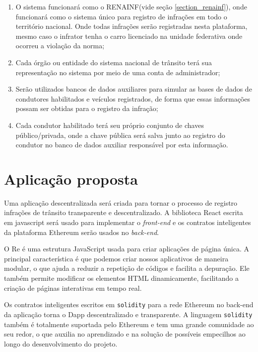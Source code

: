     \begin{enumerate}
        \item O sistema funcionará como o RENAINF(vide seção \ref{section_renainf}), onde funcionará como o sistema único para registro de infrações em todo o território nacional. Onde todas infrações serão registradas nesta plataforma, mesmo caso o infrator tenha o carro licenciado na unidade federativa onde ocorreu a violação da norma;
        \item Cada órgão ou entidade do sistema nacional de trânsito terá sua representação no sistema por meio de uma conta de administrador;
        \item Serão utilizados bancos de dados auxiliares para simular as bases de dados de condutores habilitados e veículos registrados, de forma que essas informações possam ser obtidas para o registro da infração;
        \item Cada condutor habilitado terá seu próprio conjunto de chaves público/privada, onde a chave pública será salva junto ao registro do condutor no banco de dados auxiliar responsável por esta informação.
    \end{enumerate}


\section{Aplicação proposta}

Uma aplicação descentralizada será criada para tornar o processo de registro infrações de trânsito transparente e descentralizado. A biblioteca React escrita em javascript será usado para implementar o \textit{front-end} e os contratos inteligentes da plataforma Ethereum serão usados no \textit{back-end}. 

O Re é uma estrutura JavaScript usada para criar aplicações de página única. A principal característica é que podemos criar nossos aplicativos de maneira modular, o que ajuda a reduzir a repetição de códigos e facilita a depuração. Ele também permite modificar os elementos HTML dinamicamente, facilitando a criação de páginas interativas em tempo real. 

Os contratos inteligentes escritos em \verb|solidity| para a rede Ethereum no back-end da aplicação torna o Dapp descentralizado e transparente. A linguagem \verb|solidity| também é totalmente suportada pelo Ethereum e tem uma grande comunidade ao seu redor, o que auxilia no aprendizado e na solução de possíveis empecilhos ao longo do desenvolvimento do projeto.

